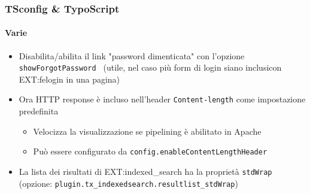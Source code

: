 %
%

\begin{frame}[fragile]
	\frametitle{TSconfig \& TypoScript}
	\framesubtitle{Varie}

	\begin{itemize}

		\item Disabilita/abilita il link "password dimenticata" con l'opzione \small\texttt{showForgotPassword }\normalsize
			(utile, nel caso più form di login siano inclusi\newline con EXT:felogin in una pagina)

		\item Ora HTTP response è incluso nell'header \texttt{Content-length} come impostazione predefinita

			\begin{itemize}
				\item Velocizza la visualizzazione se pipelining è abilitato in Apache
				\item Può essere configurato da \texttt{config.enableContentLengthHeader}
			\end{itemize}

		\item La lista dei risultati di EXT:indexed\_search ha la proprietà \texttt{stdWrap}\newline
			(opzione: \texttt{plugin.tx\_indexedsearch.resultlist\_stdWrap})

	\end{itemize}

\end{frame}


